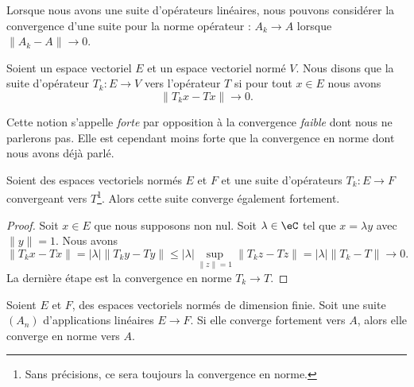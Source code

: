 Lorsque nous avons une suite d'opérateurs linéaires, nous pouvons considérer la convergence d'une suite pour la norme opérateur : \( A_k\to A\) lorsque \( \| A_k-A \|\to 0\).

\begin{definition}       \label{DEFooNREQooElLvec}
    Soient un espace vectoriel \( E\) et un espace vectoriel normé \( V\). Nous disons que la suite d'opérateur \( T_k\colon E\to V\)  vers l'opérateur $T$ si pour tout \( x\in E\) nous avons
    \begin{equation}
        \| T_kx-Tx \|\to 0.
    \end{equation}
\end{definition}

Cette notion s'appelle \emph{forte} par opposition à la convergence \emph{faible} dont nous ne parlerons pas. Elle est cependant moins forte que la convergence en norme dont nous avons déjà parlé.

\begin{proposition}     \label{PROPooRFBLooUjSirP}
    Soient des espaces vectoriels normés \( E\) et \( F\) et une suite d'opérateurs \( T_k\colon E\to F\) convergeant vers \( T\)\footnote{Sans précisions, ce sera toujours la convergence en norme.}. Alors cette suite converge également fortement.
\end{proposition}

\begin{proof}
    Soit \( x\in E\) que nous supposons non nul. Soit \( \lambda\in \eC\) tel que \( x=\lambda y\) avec \( \| y \|=1\). Nous avons
    \begin{equation}
        \| T_kx-Tx \|=| \lambda |\| T_ky-Ty \|\leq | \lambda |\sup_{\| z \|=1}\| T_kz-Tz \|=| \lambda |\| T_k-T \|\to 0.
    \end{equation}
    La dernière étape est la convergence en norme \( T_k\to T\).
\end{proof}

\begin{proposition}
    Soient \( E\) et \( F\), des espaces vectoriels normés de dimension finie. Soit une suite \( (A_n)\) d'applications linéaires \( E\to F\). Si elle converge fortement vers \( A\), alors elle converge en norme vers \( A\).
\end{proposition}

